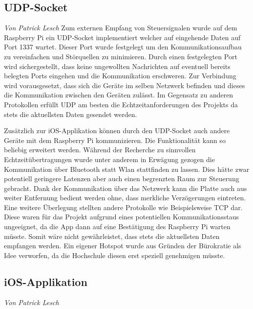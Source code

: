 \documentclass[12pt,a4paper,bibliography=totoc,listof=totoc]{scrartcl}
\begin{document}
\subsection{UDP-Socket}
\textit{Von Patrick Lesch}\newline
Zum externen Empfang von Steuersignalen wurde auf dem Raspberry Pi ein UDP-Socket implementiert welcher auf eingehende Daten auf
Port 1337 wartet. Dieser Port wurde festgelegt um den Kommunikationsaufbau zu vereinfachen und Störquellen zu minimieren. Durch 
einen festgelegten Port wird sichergestellt, dass keine ungewollten Nachrichten auf eventuell bereits belegten Ports eingehen und die 
Kommunikation erschweren. Zur Verbindung wird vorausgesetzt, dass sich die Geräte im selben Netzwerk befinden und dieses die Kommunikation
zwischen den Geräten zulässt. Im Gegensatz zu anderen Protokollen erfüllt UDP am besten die Echtzeitanforderungen des Projekts da stets
die aktuellsten Daten gesendet werden. 

Zusätzlich zur iOS-Applikation können durch den UDP-Socket auch andere Geräte mit dem Raspberry Pi kommunizieren. Die Funktionalität kann so
beliebig erweitert werden. Während der Recherche zu sinnvollen Echtzeitübertragungen wurde unter anderem in Erwägung gezogen die Kommunikation
über Bluetooth statt Wlan stattfinden zu lassen. Dies hätte zwar potentiell geringere Latenzen aber auch einen begrenzten Raum zur Steuerung gebracht.
Dank der Kommunikation über das Netzwerk kann die Platte auch aus weiter Entfernung bedient werden ohne, dass merkliche Verzögerungen eintreten. 
Eine weitere Überlegung stellten andere Protokolle wie Beispielsweise TCP dar. Diese waren für das Projekt aufgrund eines potentiellen Kommunikationsstaus 
ungeeignet, da die App dann auf eine Bestätigung des Raspberry Pi warten müsste. Somit wäre nicht gewährleistet, dass stets die aktuellsten Daten
empfangen werden. Ein eigener Hotspot wurde aus Gründen der Bürokratie als Idee verworfen, da die Hochschule diesen erst speziell genehmigen müsste.

\subsection{iOS-Applikation}
\textit{Von Patrick Lesch}\newline
\end{document}
